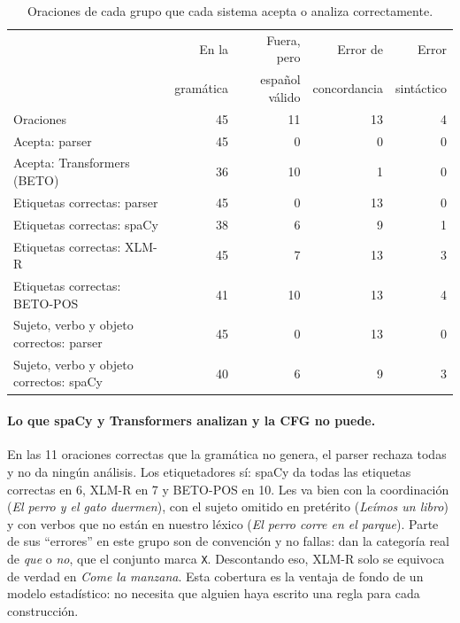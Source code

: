 \begin{table}[h]
  \centering
  \small
  \begin{tabular}{lrrrr}
    \toprule
    & En la & Fuera, pero & Error de & Error \\
    & gramática & español válido & concordancia & sintáctico \\
    \midrule
    Oraciones & 45 & 11 & 13 & 4 \\
    \midrule
    Acepta: parser & 45 & 0 & 0 & 0 \\
    Acepta: Transformers (BETO) & 36 & 10 & 1 & 0 \\
    \midrule
    Etiquetas correctas: parser & 45 & 0 & 13 & 0 \\
    Etiquetas correctas: spaCy & 38 & 6 & 9 & 1 \\
    Etiquetas correctas: XLM-R & 45 & 7 & 13 & 3 \\
    Etiquetas correctas: BETO-POS & 41 & 10 & 13 & 4 \\
    \midrule
    Sujeto, verbo y objeto correctos: parser & 45 & 0 & 13 & 0 \\
    Sujeto, verbo y objeto correctos: spaCy & 40 & 6 & 9 & 3 \\
    \bottomrule
  \end{tabular}
  \caption{Oraciones de cada grupo que cada sistema acepta o analiza correctamente.}
  \label{tab:grupos_nlp}
\end{table}

\paragraph{Lo que spaCy y Transformers analizan y la CFG no puede.} En las 11 oraciones
correctas que la gramática no genera, el parser rechaza todas y no da ningún análisis. Los
etiquetadores sí: spaCy da todas las etiquetas correctas en 6, XLM-R en 7 y BETO-POS en 10. Les
va bien con la coordinación (\emph{El perro y el gato duermen}), con el sujeto omitido en
pretérito (\emph{Leímos un libro}) y con verbos que no están en nuestro léxico (\emph{El perro
corre en el parque}). Parte de sus ``errores'' en este grupo son de convención y no fallas: dan
la categoría real de \emph{que} o \emph{no}, que el conjunto marca \texttt{X}. Descontando eso,
XLM-R solo se equivoca de verdad en \emph{Come la manzana}. Esta cobertura es la ventaja de fondo
de un modelo estadístico: no necesita que alguien haya escrito una regla para cada construcción.

